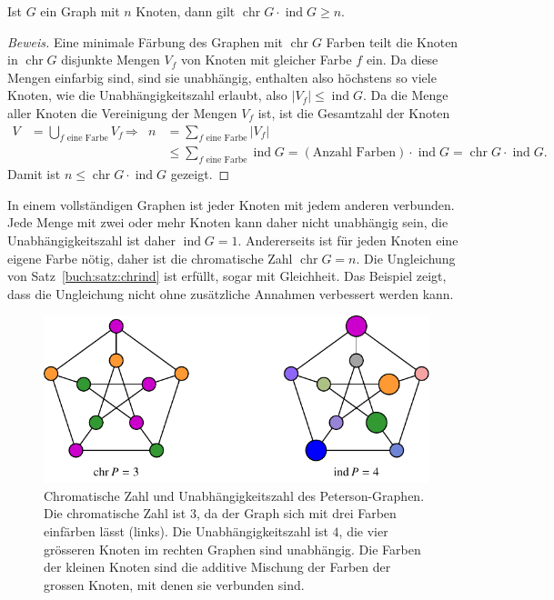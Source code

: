 \begin{satz}
\label{buch:satz:chrind}
Ist $G$ ein Graph mit $n$ Knoten, dann gilt
$\operatorname{chr}G\cdot\operatorname{ind}G\ge n$.
\end{satz}

\begin{proof}[Beweis]
Eine minimale Färbung des Graphen mit $\operatorname{chr}G$ Farben
teilt die Knoten in $\operatorname{chr}G$ disjunkte Mengen $V_f$ von Knoten mit
gleicher Farbe $f$ ein.
Da diese Mengen einfarbig sind, sind sie unabhängig, enthalten also
höchstens so viele Knoten, wie die Unabhängigkeitszahl erlaubt,
also $|V_f|\le \operatorname{ind}G$.
Da die Menge aller Knoten die Vereinigung der Mengen $V_f$ ist,
ist die Gesamtzahl der Knoten 
\begin{align*}
V
&=
\bigcup_{\text{$f$ eine Farbe}} V_f
&&\Rightarrow&
n
&=
\sum_{\text{$f$ eine Farbe}} |V_f| 
\\
&
&&&
&\le
\sum_{\text{$f$ eine Farbe}} \operatorname{ind}G
=
(\text{Anzahl Farben})\cdot \operatorname{ind}G
=
\operatorname{chr}G \cdot \operatorname{ind}G.
\end{align*}
Damit ist $n\le \operatorname{chr}G\cdot\operatorname{ind}G$ gezeigt.
\qedhere
\end{proof}

\begin{beispiel}
In einem vollständigen Graphen ist jeder Knoten mit jedem anderen verbunden.
Jede Menge mit zwei oder mehr Knoten kann daher nicht unabhängig sein, die
Unabhängigkeitszahl ist daher $\operatorname{ind}G=1$.
Andererseits ist für jeden Knoten eine eigene Farbe nötig, daher ist die
chromatische Zahl $\operatorname{chr}G=n$.
Die Ungleichung von Satz~\ref{buch:satz:chrind} ist erfüllt, sogar mit
Gleichheit.
Das Beispiel zeigt, dass die Ungleichung nicht ohne zusätzliche Annahmen
verbessert werden kann.
\end{beispiel}

\begin{figure}
\centering
\includegraphics{chapters/70-graphen/images/petersonchrind.pdf}
\caption{Chromatische Zahl und Unabhängigkeitszahl des Peterson-Graphen.
Die chromatische Zahl ist $3$, da der Graph sich mit drei Farben einfärben
lässt (links).
Die Unabhängigkeitszahl ist $4$, die vier grösseren Knoten im rechten
Graphen sind unabhängig.
Die Farben der kleinen Knoten sind die additive Mischung der Farben
der grossen Knoten, mit denen sie verbunden sind.
\label{buch:graphen:fig:chrindpeterson}}
\end{figure}

